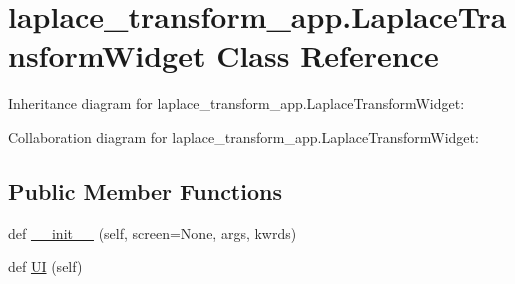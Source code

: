 \hypertarget{classlaplace__transform__app_1_1LaplaceTransformWidget}{}\section{laplace\+\_\+transform\+\_\+app.\+Laplace\+Transform\+Widget Class Reference}
\label{classlaplace__transform__app_1_1LaplaceTransformWidget}


Inheritance diagram for laplace\+\_\+transform\+\_\+app.\+Laplace\+Transform\+Widget\+:


Collaboration diagram for laplace\+\_\+transform\+\_\+app.\+Laplace\+Transform\+Widget\+:
\subsection*{Public Member Functions}
\begin{DoxyCompactItemize}
\item 
def \hyperlink{classlaplace__transform__app_1_1LaplaceTransformWidget_a7ca985289e709bd1ebddd1b7f88b18bb}{\+\_\+\+\_\+init\+\_\+\+\_\+} (self, screen=None, args, kwrds)
\item 
def \hyperlink{classlaplace__transform__app_1_1LaplaceTransformWidget_aa36b0a46696be18b7d4b7869e0ba5713}{UI} (self)
\end{DoxyCompactItemize}
